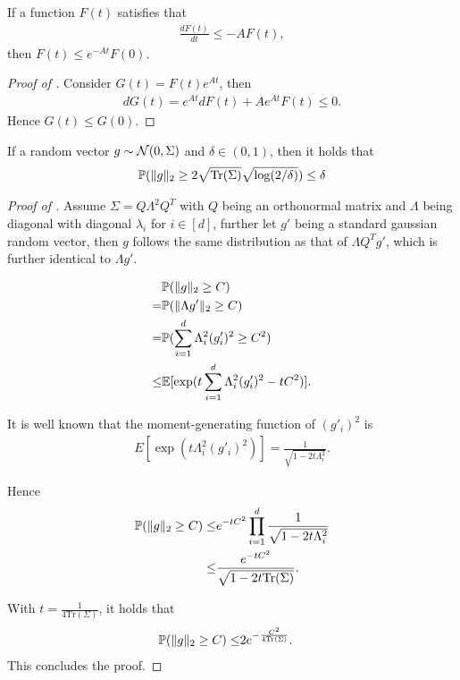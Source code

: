 \begin{lemma}
\label{lem:expdecay}
If a function $F(t)$ satisfies that
\begin{align*}
    \frac{d F(t)}{dt} \le -A F(t),
\end{align*}
then $F(t) \le e^{-At} F(0)$.
\end{lemma}

\begin{proof}[Proof of ]
    Consider $G(t) = F(t) e^{At}$, then
    \begin{align*}
        d G(t) = e^{At} dF(t) + A e^{At} F(t) \le 0.
    \end{align*}
    Hence $G(t) \le G(0)$.
\end{proof}


\begin{lemma}
\label{lem:normbound}
If a random vector $g \sim \mathcal{N}(0, \Sigma)$ and $\delta \in (0, 1)$, then it holds that
\begin{align*}
    \mathbb{P}( \| g \|_2  \ge 2 \sqrt{ \mathrm{Tr}(\Sigma)}\sqrt{ \log(2/\delta)} )  \le \delta
\end{align*}
\end{lemma}

\begin{proof}[Proof of ]
    Assume $\Sigma = Q \Lambda^2 Q^T$ with $Q$ being an orthonormal matrix and $\Lambda$ being diagonal with diagonal $\lambda_i$ for $i \in [d]$, further let $g'$ being a standard gaussian random vector, then $g$ follows the same distribution as that of $\Lambda Q^T g'$, which is further identical to $\Lambda g'$.

    \begin{align*}
        &\mathbb{P}( \| g \|_2  \ge   C) \\
        =&  \mathbb{P}( \| \Lambda g' \|_2  \ge   C) \\
        =& \mathbb{P}( \sum_{i = 1}^d \Lambda_i^2 (g'_i)^2 \ge C^2) \\
        \le& \mathbb{E}[\exp( t\sum_{i = 1}^d \Lambda_i^2 (g'_i)^2 - tC^2)].
    \end{align*}

    It is well known that the moment-generating function of $(g'_i)^2$ is
    \begin{align*}
        E[\exp(t\Lambda_i^2 (g'_i)^2)] = \frac{1}{\sqrt{1 - 2t \Lambda_i^2}}.
    \end{align*}

    Hence
    \begin{align*}
        \mathbb{P}( \| g \|_2  \ge   C) \le& e^{-tC^2} \prod_{i = 1}^d \frac{1}{\sqrt{1 - 2t \Lambda_i^2}} \\
        \le&  \frac{e^{-tC^2}}{\sqrt{1 - 2t \mathrm{Tr}(\Sigma)}}.
    \end{align*}

    With $t = \frac{1}{4\mathrm{Tr}(\Sigma)}$, it holds that
    \begin{align*}
    \mathbb{P}( \| g \|_2  \ge   C) \le& 2 e^{-\frac{C^2}{4\mathrm{Tr}(\Sigma)}}.
    \end{align*}
    This concludes the proof.
\end{proof}


